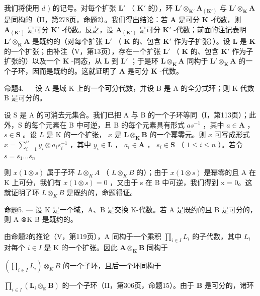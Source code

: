我们将使用 \(d\) ) 的记号。对每个扩张 \(\mathbf{L}'\) （ \(\mathbf{K}'\) 的），环 \(\mathbf{L}' \otimes_{\mathbf{K}'} \mathbf{A}_{(\mathbf{K}')}\) 与 \(\mathbf{L}' \otimes_{\mathbf{K}} \mathbf{A}\) 是同构的（II，第278页，命题2）。我们得出结论：若 \(\mathbf{A}\) 是可分 \(\mathbf{K}\) -代数，则 \(\mathbf{A}_{(\mathbf{K}')}\) 是可分 \(\mathbf{K}'\) -代数。反之，设 \(\mathbf{A}_{(\mathbf{K}')}\) 是可分 \(\mathbf{K}'\) -代数；前面的注记表明 \(\mathbf{L}' \otimes_{\mathbf{K}} \mathbf{A}\) 是既约的（对每个扩张 \(\mathbf{L}'\) （ \(\mathbf{K}\) 的、包含 \(\mathbf{K}'\) 作为子扩张））。设 \(\mathbf{L}\) 是 \(\mathbf{K}\) 的一个扩张；由补注（V，第13页），存在一个扩张 \(\mathbf{L}'\) （ \(\mathbf{K}\) 的、包含 \(\mathbf{K}'\) 作为子扩张的）以及一个 \(\mathbf{K}\) -同态，从 \(\mathbf{L}\) 到 \(\mathbf{L}'\) ；于是环 \(\mathbf{L} \otimes_{\mathbf{K}} \mathbf{A}\) 同构于 \(\mathbf{L}' \otimes_{\mathbf{K}} \mathbf{A}\) 的一个子环，因而是既约的。这就证明了 \(\mathbf{A}\) 是可分 \(\mathbf{K}\) -代数。

命题4. --- 设 A 是域 K 上的一个可分代数，并设 B 是 A 的全分式环；则 K-代数 B 是可分的。

设 S 是 A 的可消去元集合。我们已把 A 与 B 的一个子环等同（I，第113页）；此外，S 的每个元素在 B 中可逆，且 B 的每个元素具有形式 \(as^{-1}\) ，其中 \(a \in \mathbf{A}\) ， \(s \in \mathbf{S}\) 。设 \(L\) 是 K 的一个扩张， \(x\) 是 \(\mathbf{L} \otimes_{\mathbf{K}} \mathbf{B}\) 的一个幂零元。则 \(x\) 可写成形式 \(x = \sum_{i=1}^{n} y_i \otimes a_i s_i^{-1}\) ，其中 \(y_i \in \mathbf{L}\) ， \(a_i \in \mathbf{A}\) ， \(s_i \in \mathbf{S}\) （ \(1 \leqslant i \leqslant n\) ）。若令 \(s = s_1 \ldots s_n\)

则 \(x(1 \otimes s)\) 属于子环 \(L \otimes_{K} A\) （ \(L \otimes_{K} B\) 的）；由于 \(x(1 \otimes s)\) 是幂零的且 A 在 K 上可分，我们有 \(x(1 \otimes s) = 0\) ，又由于 s 在 B 中可逆，我们得到 x = 0。这就证明了环 \(L \otimes_{K} B\) 是既约的，命题得证。

命题5. --- 设 K 是一个域，A、B 是交换 K-代数。若 A 是既约的且 B 是可分的，则 A ⊗K B 是既约的。

由命题2的推论（V，第119页），A 同构于一个乘积 \(\prod_{i\in I}L_i\) 的子代数，其中 \(L_{i}\) 对每个 \(i\in I\) 是 K 的一个扩张。因此 \(\mathbf{A}\otimes_{\mathbf{K}}\mathbf{B}\) 同构于

\(\left(\prod_{i\in I}L_i\right)\otimes_K B\) 的一个子环，且后一个环同构于

\(\prod_{i\in I}(\mathbf{L}_i\otimes_{\mathbb{K}}\mathbf{B})\) 的一个子环（II，第306页，命题15）。由于 \(\mathbf{B}\) 是可分的，诸环

